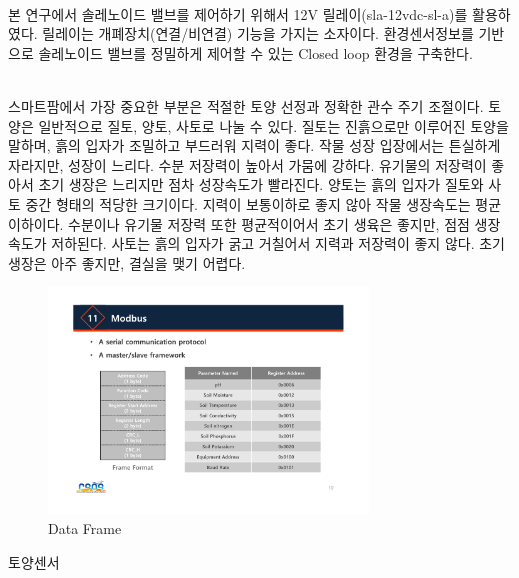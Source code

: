\documentclass[11pt]{article}
\begin{document}
\indent \\본 연구에서 솔레노이드 밸브를 제어하기 위해서 12V 릴레이(sla-12vdc-sl-a)를 활용하였다. 릴레이는 개폐장치(연결/비연결) 기능을 가지는 소자이다. 환경센서정보를 기반으로 솔레노이드 밸브를 정밀하게 제어할 수 있는 Closed loop 환경을 구축한다. 

\indent \\스마트팜에서 가장 중요한 부분은 적절한 토양 선정과 정확한 관수 주기 조절이다. 토양은 일반적으로 질토, 양토, 사토로 나눌 수 있다.
질토는 진흙으로만 이루어진 토양을 말하며, 흙의 입자가 조밀하고 부드러워 지력이 좋다. 작물 성장 입장에서는 튼실하게 자라지만, 성장이 느리다. 수분 저장력이 높아서 가뭄에 강하다. 유기물의 저장력이 좋아서 초기 생장은 느리지만 점차 성장속도가 빨라진다.
양토는 흙의 입자가 질토와 사토 중간 형태의 적당한 크기이다. 지력이 보통이하로 좋지 않아 작물 생장속도는 평균 이하이다. 수분이나 유기물 저장력 또한 평균적이어서 초기 생육은 좋지만, 점점 생장속도가 저하된다.
사토는 흙의 입자가 굵고 거칠어서 지력과 저장력이 좋지 않다. 초기 생장은 아주 좋지만, 결실을 맺기 어렵다. 


\begin{figure}[!htbp]
    \centering
       \includegraphics[width=8.5cm]{Figure/Frame_format.pdf}
       \hfil
    \caption{Data Frame}
    \label{Data_Frame}
\end{figure}

토양센서


\indent \\
\end{document}
